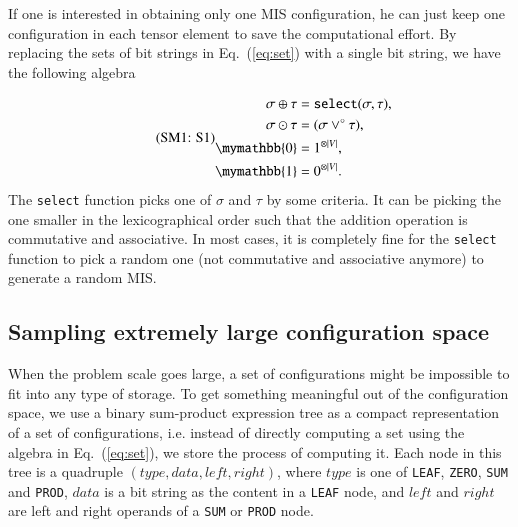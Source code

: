 \documentclass[onefignum, onetabnum]{siamart190516}
\newcommand{\eqname}[1]{\stepcounter{equation}\tag{\theequation : #1}}
\newcommand{\<}{\langle}
\renewcommand{\>}{\rangle}
\newcommand{\Eq}[1]{Eq.~(\ref{#1})}
\begin{document}
If one is interested in obtaining only one MIS configuration, he can just keep one configuration in each tensor element to save the computational effort.
By replacing the sets of bit strings in \Eq{eq:set} with a single bit string, we have the following algebra

\begin{equation}
\eqname{S1}
\begin{split}
    \sigma \oplus \tau &= \texttt{select}(\sigma, \tau), \\
    \sigma \odot \tau &= (\sigma\lor^\circ \tau),\\
    \mymathbb{0} &= 1^{\otimes |V|}, \\
    \mymathbb{1} &= 0^{\otimes |V|}.
\end{split}\label{eq:singleconfig}
\end{equation}
The \texttt{select} function picks one of $\sigma$ and $\tau$ by some criteria.
It can be picking the one smaller in the lexicographical order such that the addition operation is commutative and associative.
In most cases, it is completely fine for the \texttt{select} function to pick a random one (not commutative and associative anymore) to generate a random MIS.

\subsection{Sampling extremely large configuration space}
When the problem scale goes large, a set of configurations might be impossible to fit into any type of storage.
To get something meaningful out of the configuration space, we use a binary sum-product expression tree as a compact representation of a set of configurations, i.e. instead of directly computing a set using the algebra in \Eq{eq:set}, we store the process of computing it.
Each node in this tree is a quadruple $(type, data, left, right)$, where $type$ is one of \texttt{LEAF}, \texttt{ZERO}, \texttt{SUM} and \texttt{PROD}, $data$ is a bit string as the content in a \texttt{LEAF} node, and $left$ and $right$ are left and right operands of a \texttt{SUM} or \texttt{PROD} node.
\end{document}

